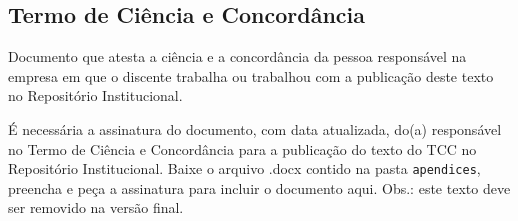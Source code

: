 \documentclass{bsimc}
\begin{document}
	\begin{anexosenv}
		\partanexos
		\chapter{Termo de Ciência e Concordância}
		Documento que atesta a ciência e a concordância da pessoa responsável na empresa em que o discente trabalha ou trabalhou com a publicação deste texto no Repositório Institucional.

		{\color{blue}É necessária a assinatura do documento, com data atualizada, do(a) responsável no Termo de Ciência e Concordância para a publicação do texto do TCC no Repositório Institucional. Baixe o arquivo .docx contido na pasta \texttt{apendices}, preencha e peça a assinatura para incluir o documento aqui. Obs.: este texto deve ser removido na versão final.}


	\end{anexosenv}
\end{document}
